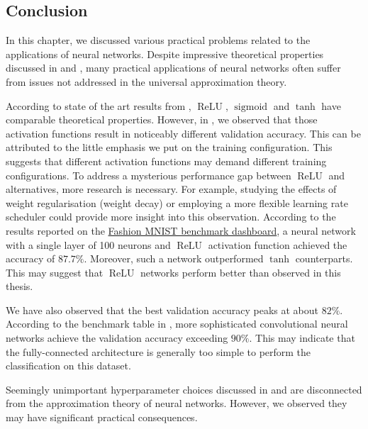 \subsection{Conclusion}

In this chapter, we discussed various practical problems related to the applications of neural networks. Despite impressive theoretical properties discussed in  and , many practical applications of neural networks often suffer from issues not addressed in the universal approximation theory. 

According to state of the art results from  , $\operatorname{ReLU}$, $\operatorname{sigmoid}$ and $\operatorname{tanh}$ have comparable theoretical properties. However, in , we observed that those activation functions result in noticeably different validation accuracy. This can be attributed to the little emphasis we put on the training configuration. This suggests that different activation functions may demand different training configurations. To address a mysterious performance gap between $\operatorname{ReLU}$ and alternatives,
more research is necessary. For example, studying the effects of weight regularisation (weight decay) or employing a more flexible learning rate scheduler could provide more insight into this observation. According to the results reported on the  \href{http://fashion-mnist.s3-website.eu-central-1.amazonaws.com/}{Fashion MNIST benchmark dashboard}, a neural network with a single layer of 100 neurons and $\operatorname{ReLU}$ activation function achieved the accuracy of $87.7\%$. Moreover, such a network outperformed $\tanh$ counterparts. This may suggest that $\operatorname{ReLU}$ networks perform better than observed in this thesis.

We have also observed that the best validation accuracy peaks at about $82\%$.  According to the benchmark table in \cite{fashionmnistgithub}, more sophisticated convolutional neural networks achieve the validation accuracy exceeding $90\%$. This may indicate that the fully-connected architecture is generally too simple to perform the classification on this dataset.

Seemingly unimportant hyperparameter choices discussed in  and  are disconnected from the approximation theory of neural networks. However, we observed they may have significant practical consequences.